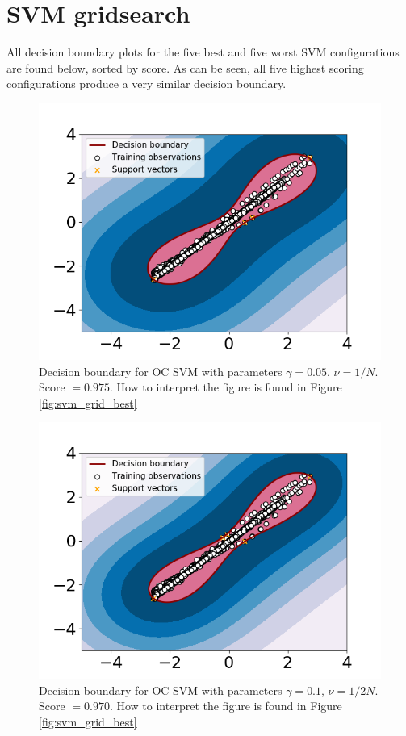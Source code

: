 
\chapter{SVM gridsearch}\label{apendix:svm_grid}
    All decision boundary plots for the five best and five worst SVM configurations are found below, sorted by score. As can be seen, all five highest scoring configurations produce a very similar decision boundary.  

    \begin{figure}
        \centering
        \includegraphics[width = .7\textwidth]{report/figures/analysis/gridsearch/Novelty detection, 1, training, gamma = 0.05 nu = 1.0583130489998942e-05.png}
        \caption{Decision boundary for OC SVM with parameters $\gamma = 0.05$, $\nu = 1/N$. Score $=0.975$. How to interpret the figure is found in Figure \ref{fig:svm_grid_best}}
    \end{figure}
    
    \begin{figure}
        \centering
        \includegraphics[width = .7\textwidth]{report/figures/analysis/gridsearch/Novelty detection, 2 training, gamma = 0.1 nu = 5.291565244999471e-05.png}
        \caption{Decision boundary for OC SVM with parameters $\gamma = 0.1$, $\nu = 1/2N$. Score $=0.970$. How to interpret the figure is found in Figure \ref{fig:svm_grid_best}}
    \end{figure}
    
